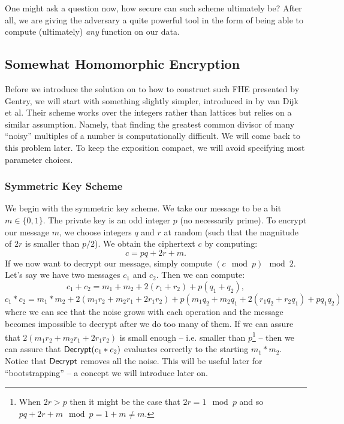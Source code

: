 One might ask a question now, how secure can such scheme ultimately be? After all, we are giving the adversary a quite powerful tool in the form of being able to compute (ultimately) \textit{any} function on our data.

\subsection{Somewhat Homomorphic Encryption}\label{int_she}
Before we introduce the solution on to how to construct such FHE presented by Gentry, we will start with something slightly simpler, introduced in \cite{int_scheme} by van Dijk et al. Their scheme works over the integers rather than lattices but relies on a similar assumption. Namely, that finding the greatest common divisor of many ``noisy'' multiples of a number is computationally difficult. We will come back to this problem later. To keep the exposition compact, we will avoid specifying most parameter choices.

\subsubsection*{Symmetric Key Scheme}
We begin with the symmetric key scheme. We take our message to be a bit $m \in \{0,1\}$. The private key is an odd integer $p$ (no necessarily prime). To encrypt our message $m$, we choose integers $q$ and $r$ at random (such that the magnitude of $2r$ is smaller than $p/2$). We obtain the ciphertext $c$ by computing: 
\begin{equation}c = pq + 2r + m.\end{equation}
If we now want to decrypt our message, simply compute $(c \mod p) \mod 2$. Let's say we have two messages $c_1$ and $c_2$. Then we can compute:
\[ c_1 + c_2 = m_1 + m_2 + 2(r_1 + r_2) + p(q_1 + q_2), \]
\[ c_1 * c_2 = m_1 * m_2 + 2(m_1r_2 + m_2r_1 + 2r_1r_2) + p(m_1q_2 + m_2q_1 + 2(r_1q_2 + r_2q_1) + pq_1q_2)\]
where we can see that the noise grows with each operation and the message becomes impossible to decrypt after we do too many of them. If we can assure that $2(m_1r_2 + m_2r_1 + 2r_1r_2)$ is small enough -- i.e. smaller than $p$\footnote{When $2r > p$ then it might be the case that $2r = 1 \mod p$ and so $pq + 2r + m \mod p = 1 + m \neq m$.} -- then we can assure that $\textsf{Decrypt}(c_1 * c_2)$ evaluates correctly to the starting $m_1 * m_2$. Notice that $\textsf{Decrypt}$ removes all the noise. This will be useful later for ``bootstrapping'' -- a concept we will introduce later on.

